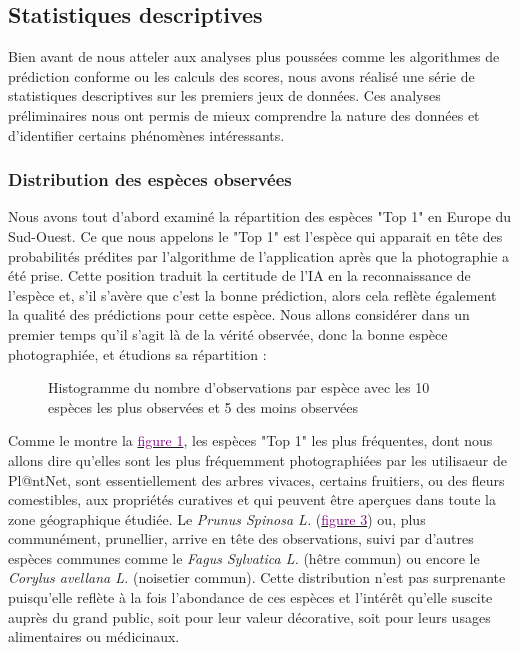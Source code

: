 \documentclass[a4paper,12pt]{article}
\begin{document}

\subsection{Statistiques descriptives}

Bien avant de nous atteler aux analyses plus poussées comme les algorithmes de prédiction conforme ou les calculs des scores, nous avons réalisé une série de statistiques descriptives sur les premiers jeux de données. Ces analyses préliminaires nous ont permis de mieux comprendre la nature des données et d'identifier certains phénomènes intéressants.

\subsubsection{Distribution des espèces observées}

Nous avons tout d'abord examiné la répartition des espèces "Top 1" en Europe du Sud-Ouest. Ce que nous appelons le "Top 1" est l'espèce qui apparait en tête des probabilités prédites par l'algorithme de l'application après que la photographie a été prise. Cette position traduit la certitude de l'IA en la reconnaissance de l'espèce et, s'il s'avère que c'est la bonne prédiction, alors cela reflète également la qualité des prédictions pour cette espèce. Nous allons considérer dans un premier temps qu'il s'agit là de la vérité observée, donc la bonne espèce photographiée, et étudions sa répartition :

\begin{figure}[H]
    \centering
    
    \caption{Histogramme du nombre d'observations par espèce avec les 10 espèces les plus observées et 5 des moins observées}
    \label{fig1}
\end{figure}

Comme le montre la \hyperref[fig1]{\textcolor{purple}{figure 1}}, les espèces "Top 1" les plus fréquentes, dont nous allons dire qu'elles sont les plus fréquemment photographiées par les utilisaeur de Pl@ntNet, sont essentiellement des arbres vivaces, certains fruitiers, ou des fleurs comestibles, aux propriétés curatives et qui peuvent être aperçues dans toute la zone géographique étudiée. Le \textit{Prunus Spinosa L.} (\hyperref[fig:prunus]{\textcolor{purple}{figure 3}}) ou, plus communément, prunellier, arrive en tête des observations, suivi par d'autres espèces communes comme le \textit{Fagus Sylvatica L.} (hêtre commun) ou encore le \textit{Corylus avellana L.} (noisetier commun). Cette distribution n'est pas surprenante puisqu'elle reflète à la fois l'abondance de ces espèces et l'intérêt qu'elle suscite auprès du grand public, soit pour leur valeur décorative, soit pour leurs usages alimentaires ou médicinaux.
\end{document}
